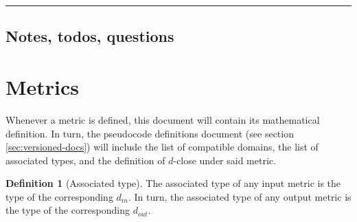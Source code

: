 \documentclass[11pt,a4paper]{article}
\theoremstyle{definition}
\newtheorem{definition}[theorem]{Definition}
\newcommand{\horizline}{\noindent\rule{\textwidth}{1pt}}
\newcommand{\din}{d_{in}}
\newcommand{\dout}{d_{out}}
\newcommand{\silvia}[1]{{ {\color{blue}{(silvia)~#1}}}}
\newcommand{\connor}[1]{{ {\color{teal}{(connor)~#1}}}}
\newcommand{\todo}{{\textcolor{red}{TODO }}}
\begin{document}
\horizline

\subsection{Notes, todos, questions}



\section{Metrics}
Whenever a metric is defined, this document will contain its mathematical definition. In turn, the pseudocode definitions document (see section \ref{sec:versioned-docs}) will include the list of compatible domains, the list of associated types, and the definition of $d$-close under said metric.






\begin{definition}[Associated type]
    The associated type of any input metric is the type of the corresponding $\din$. In turn, the associated type of any output metric is the type of the corresponding $\dout$.
\end{definition}
\end{document}

